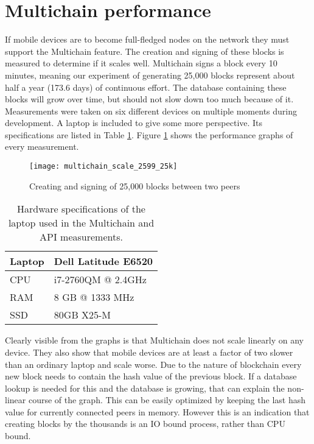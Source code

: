 \section{Multichain performance}\label{sec:multichain_perf}
If mobile devices are to become full-fledged nodes on the network they must support the Multichain feature.
The creation and signing of these blocks is measured to determine if it scales well.
Multichain signs a block every 10 minutes, meaning our experiment of generating 25,000 blocks represent about half a year (173.6 days) of continuous effort.
The database containing these blocks will grow over time, but should not slow down too much because of it.
Measurements were taken on six different devices on multiple moments during development.
A laptop is included to give some more perspective.
Its specifications are listed in Table \ref{table:specs_laptop}.
Figure \ref{fig:multichain_25} shows the performance graphs of every measurement.
\begin{figure}[H]
	\centering
	\texttt{[image: multichain\_scale\_2599\_25k]}
	\caption{Creating and signing of 25,000 blocks between two peers}
	\label{fig:multichain_25}
\end{figure}
\begin{table}[H]
	\begin{tabular}{l | l} \hline
		Laptop & Dell Latitude E6520 \\ \hline \hline
		CPU & i7-2760QM @ 2.4GHz \\ \hline
		RAM & 8 GB @ 1333 MHz \\ \hline %
		SSD & 80GB X25-M \\ \hline %
	\end{tabular}
	\caption{Hardware specifications of the laptop used in the Multichain and API measurements.}
	\label{table:specs_laptop}
\end{table}
Clearly visible from the graphs is that Multichain does not scale linearly on any device.
They also show that mobile devices are at least a factor of two slower than an ordinary laptop and scale worse.
Due to the nature of blockchain every new block needs to contain the hash value of the previous block.
If a database lookup is needed for this and the database is growing, that can explain the non-linear course of the graph.
This can be easily optimized by keeping the last hash value for currently connected peers in memory.
However this is an indication that creating blocks by the thousands is an IO bound process, rather than CPU bound.
